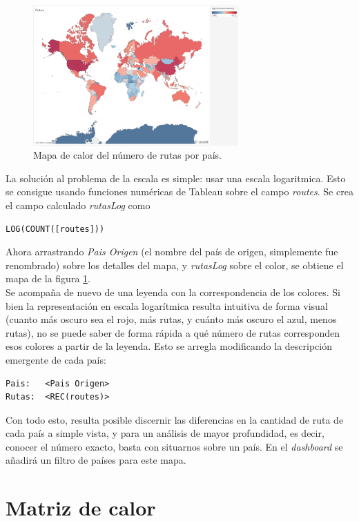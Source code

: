 \documentclass[11pt]{opticajnl}
\begin{document}
\begin{figure}[h]
\centering
\includegraphics[width=0.7\textwidth]{fotos/2.png}
\caption{Mapa de calor del número de rutas por país.}
\label{fig:2}
\end{figure}

La solución al problema de la escala es simple: usar una escala logaritmica. Esto se consigue usando funciones numéricas de Tableau sobre el campo \textit{routes}. Se crea el campo calculado \textit{rutasLog} como 
\begin{lstlisting}[style=terminal]
LOG(COUNT([routes]))
\end{lstlisting}

Ahora arrastrando \textit{Pais Origen} (el nombre del país de origen, simplemente fue renombrado) sobre los detalles del mapa, y \textit{rutasLog} sobre el color, se obtiene el mapa de la figura \ref{fig:2}. \\

Se acompaña de nuevo de una leyenda con la correspondencia de los colores. Si bien la representación en escala logarítmica resulta intuitiva de forma visual (cuanto más oscuro sea el rojo, más rutas, y cuánto más oscuro el azul, menos rutas), no se puede saber de forma rápida a qué número de rutas corresponden esos colores a partir de la leyenda. Esto se arregla modificando la descripción emergente de cada país: 
\begin{lstlisting}[style=terminal]
Pais:	<Pais Origen>
Rutas:	<REC(routes)>
\end{lstlisting}

Con todo esto, resulta posible discernir las diferencias en la cantidad de ruta de cada país a simple vista, y para un análisis de mayor profundidad, es decir, conocer el número exacto, basta con situarnos sobre un país. En el \textit{dashboard} se añadirá un filtro de países para este mapa. 

\section{Matriz de calor}
\end{document}
